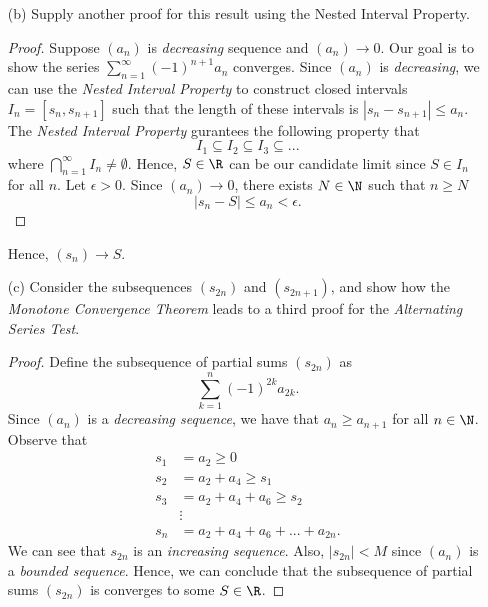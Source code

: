 \begin{enumerate}
\begin{proof}
        Let \( \epsilon > 0 \). All is left to show is that 
        \[ \Big|\sum_{k=1}^{n}(-1)^{k+1} a_k \Big| < \epsilon.\]
        Hence, for some \( N \in \N \), let \( n > m \geq N \) and \( (a_n) \to 0 \) such that 
        \begin{align*}
            \Big| \sum_{k=1}^{\infty} (-1)^{k+1} a_k \Big|&\leq |a_{m+1}| \\
                                        &< \epsilon.            
        \end{align*}
        Hence, the series \( \sum_{k=1}^{\infty}(-1)^{k+1} a_k \) meets the \textit{Cauchy Criterion}.
        \end{proof}
    \item[(b)] Supply another proof for this result using the Nested Interval Property. 
        \begin{proof}
            Suppose \( (a_n)\) is \textit{decreasing} sequence and \( (a_n) \to 0 \). Our goal is to show the series \( \sum_{n=1}^{\infty} (-1)^{n+1}a_n\) converges. Since \( (a_n)\) is \textit{decreasing}, we can use the \textit{Nested Interval Property} to construct closed intervals \( I_n = [s_n, s_{n+1}] \) such that the length of these intervals is \( |s_{n} - s_{n+1}| \leq a_n\). The \textit{Nested Interval Property} gurantees the following property that 
            \[ I_1 \subseteq I_2 \subseteq I_3 \subseteq ...  \]
            where \( \bigcap_{n=1}^{\infty} I_n \neq \emptyset\). Hence, \( S \in \R \) can be our candidate limit since \( S \in I_n\) for all \( n \). Let \( \epsilon > 0 \). Since \( (a_n) \to 0 \), there exists \( N \in \N \) such that \( n \geq N \)
            \[ |s_n - S | \leq a_n < \epsilon.\]
        \end{proof}
        Hence, \( (s_n) \to S \). 
    \item[(c)] Consider the subsequences \( (s_{2n})\) and \( (s_{2n+1})\), and show how the \textit{Monotone Convergence Theorem} leads to a third proof for the \textit{Alternating Series Test}. 
        \begin{proof}
        Define the subsequence of partial sums \( (s_{2n})\) as 
        \[ \sum_{k=1}^{n} (-1)^{2k} a_{2k}.\]
        Since \( (a_n)\) is a \textit{decreasing sequence}, we have that \( a_n \geq a_{n+1}\) for all \( n \in \N \). Observe that 
        \begin{align*}
            s_1 &= a_2 \geq 0  \\
            s_2  &= a_2 + a_4  \geq s_1 \\
            s_3 &= a_2 + a_4 + a_6 \geq s_2 \\
                &\vdots \\ 
            s_n &= a_2 + a_4 + a_6 + ... + a_{2n}.
        \end{align*}
        We can see that \( s_{2n}\) is an \textit{increasing sequence}. Also, \(|s_{2n}| < M \) since \( (a_n)\) is a \textit{bounded sequence}. Hence, we can conclude that the subsequence of partial sums \( (s_{2n})\) is converges to some \( S \in \R \). 


\end{proof}
\end{enumerate}
